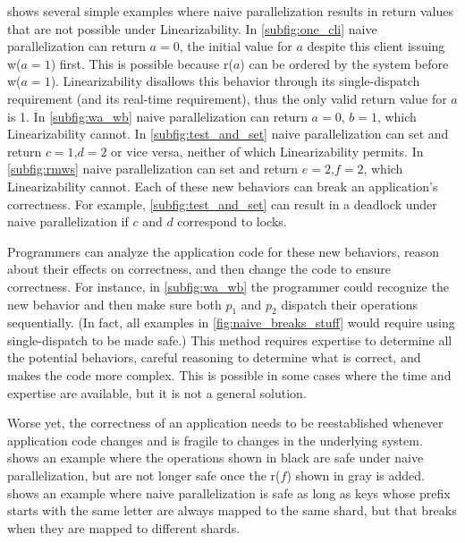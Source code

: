 
 shows several simple examples where naive parallelization results in return values that are not possible under Linearizability.
In \cref{subfig:one_cli} naive parallelization can return $a=0$, the initial value for $a$ despite this client issuing w($a=1$) first.
This is possible because r($a$) can be ordered by the system before w($a=1$).
Linearizability disallows this behavior through its single-dispatch requirement (and its real-time requirement), thus the only valid return value for $a$ is 1.
In \cref{subfig:wa_wb} naive parallelization can return $a=0$, $b=1$, which Linearizability cannot.
In \cref{subfig:test_and_set} naive parallelization can set and return $c=1$,$d=2$ or vice versa, neither of which Linearizability permits.
In \cref{subfig:rmws} naive parallelization can set and return $e=2$,$f=2$, which Linearizability cannot.
Each of these new behaviors can break an application's correctness.
For example, \cref{subfig:test_and_set} can result in a deadlock under naive parallelization if $c$ and $d$ correspond to locks.


Programmers can analyze the application code for these new behaviors, reason about their effects on correctness, and then change the code to ensure correctness. For instance, in \cref{subfig:wa_wb} the programmer could recognize the new behavior and then make sure both $p_1$ and $p_2$ dispatch their operations sequentially.
(In fact, all examples in \cref{fig:naive_breaks_stuff} would require using single-dispatch to be made safe.)
This method requires expertise to determine all the potential behaviors, careful reasoning to determine what is correct, and makes the code more complex. This is possible in some cases where the time and expertise are available, but it is not a general solution.

Worse yet, the correctness of an application needs to be reestablished whenever application code changes and is fragile to changes in the underlying system.  shows an example where the operations shown in black are safe under naive parallelization, but are not longer safe once the r($f$) shown in gray is added.
 shows an example where naive parallelization is safe as long as keys whose prefix starts with the same letter are always mapped to the same shard, but that breaks when they are mapped to different shards.

